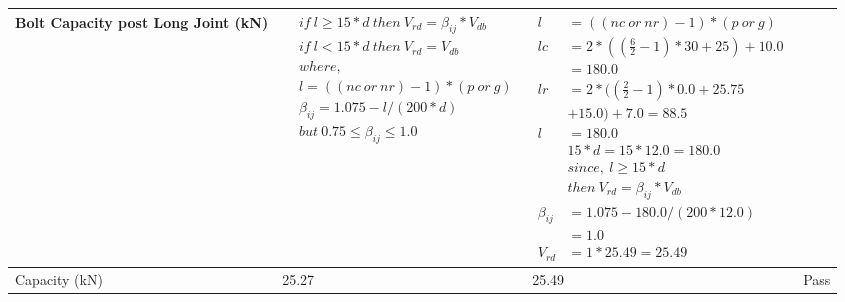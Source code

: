 \documentclass{article}%
\begin{document}
\begin{longtable}{|p{4cm}|p{5cm}|p{5.5cm}|p{1.5cm}|}
Bolt Capacity post Long Joint (kN)&$\begin{aligned} &if~l\geq 15 * d~then~V_{rd} = \beta_{ij} * V_{db} \\ & if~l < 15 * d~then~V_{rd} = V_{db} \\ & where,\\ & l = ((nc~or~nr) - 1) * (p~or~g) \\ & \beta_{ij} = 1.075 - l/(200 * d) \\ & but~0.75\leq\beta_{ij}\leq1.0 \end{aligned}$&$\begin{aligned} l~&= ((nc~or~nr) - 1) * (p~or~g) \\  lc&= 2*((\frac{6}{2} - 1) * 30+25)+ 10.0\\&=180.0\\  lr&= 2*((\frac{2}{2} - 1) * 0.0+25.75\\& +15.0)+ 7.0=88.5\\  l~&= 180.0\\ &15 * d = 15 * 12.0 = 180.0 \\ &since,~l \geq 15 * d~\\ &then~V_{rd} = \beta_{ij} * V_{db} \\ \beta_{ij} &= 1.075 - 180.0/(200*12.0)\\& =1.0\\  V_{rd}& = 1 * 25.49=25.49 \end{aligned}$&\\%
\hline%
Capacity (kN)&25.27&25.49&Pass\\%
\hline%
\end{longtable}

%
\newpage%
\end{document}
